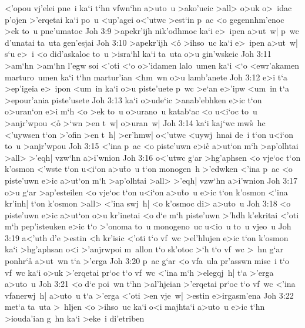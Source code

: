 <'opou
vj'elei
pne~i
ka`i
t`hn
vfwn`hn
a>uto~u
>ako'ueic
>all>
o>uk
o>~idac
p'ojen
>'erqetai
ka`i
po~u
<up'agei
o<'utwc
>est`in
p~ac
<o
gegennhm'enoc
>ek
to~u
pne'umatoc\bibvsend
\vs Joh 3:9
>apekr'ijh
nik'odhmoc
ka`i
e>~ipen
a>ut~w|
p~wc
d'unatai
ta~uta
gen'esjai\bibvsend
\vs Joh 3:10
>apekr'ijh
<o\r{}
>ihso~uc
ka`i
e>~ipen
a>ut~w|
s`u
e>~i
<o
did'askaloc
to~u
>isra`hl
ka`i
ta~uta
o>u
gin'wskeic\bibvsend
\vs Joh 3:11
>am`hn
>am`hn
l'egw
soi
<'oti
<`o
o>'idamen
lalo~umen
ka`i
<`o
<ewr'akamen
marturo~umen
ka`i
t`hn
martur'ian
<hm~wn
o>u
lamb'anete\bibvsend
\vs Joh 3:12
e>i
t`a
>ep'igeia
e>~ipon
<um~in
ka`i
o>u
piste'uete
p~wc
>e`an
e>'ipw
<um~in
t`a
>epour'ania
piste'usete\bibvsend
\vs Joh 3:13
ka`i
o>ude`ic
>anab'ebhken
e>ic
t`on
o>uran`on
e>i
m`h
<o
>ek
to~u
o>urano~u
katab`ac
<o
u<i`oc
to~u
>anjr'wpou
<o\r{}
>`wn
>en
t~w|
o>uran~w|\bibvsend
\vs Joh 3:14
ka`i
kaj`wc
mw\r{s}~hc
<'uywsen
t`on
>'ofin
>en
t~h|
>er'hmw|
o<'utwc
<uywj~hnai
de~i
t`on
u<i`on
to~u
>anjr'wpou\bibvsend
\vs Joh 3:15
<'ina
p~ac
<o
piste'uwn
e>ic\r{}
a>ut`on
m`h
>ap'olhtai
>all>
>'eqh|
vzw`hn
a>i'wnion\bibvsend
\vs Joh 3:16
o<'utwc
g`ar
>hg'aphsen
<o
vje`oc
t`on
k'osmon
<'wste
t`on
u<i`on
a>u\r{t}o~u
t`on
monogen~h
>'edwken
<'ina
p~ac
<o
piste'uwn
e>ic
a>ut`on
m`h
>ap'olhtai
>all>
>'eqh|
vzw`hn
a>i'wnion\bibvsend
\vs Joh 3:17
o>u
g`ar
>ap'esteilen
<o
vje`oc
t`on
u<i`on
a>u\r{t}o~u
e>ic
t`on
k'osmon
<'ina
kr'inh|
t`on
k'osmon
>all>
<'ina
swj~h|
<o
k'osmoc
di>
a>uto~u\bibvsend
\vs Joh 3:18
<o
piste'uwn
e>ic
a>ut`on
o>u
kr'inetai
<o
d`e
m`h
piste'uwn
>'hdh
k'ekritai
<'oti
m`h
pep'isteuken
e>ic
t`o
>'onoma
to~u
monogeno~uc
u<io~u
to~u
vjeo~u\bibvsend
\vs Joh 3:19
a<'uth
d'e
>estin
<h
kr'isic
<'oti
t`o
vf~wc
>el'hlujen
e>ic
t`on
k'osmon
ka`i
>hg'aphsan
o<i
>'anjrwpoi
m~allon
t`o
sk'otoc
>`h
t`o
vf~wc
>~hn
g`ar
ponhr`a\r{}
a>ut~wn
t`a
>'erga\bibvsend
\vs Joh 3:20
p~ac
g`ar
<o
vfa~ula
pr'asswn
mise~i
t`o
vf~wc
ka`i
o>uk
>'erqetai
pr`oc
t`o
vf~wc
<'ina
m`h
>elegqj~h|
t`a
>'erga
a>uto~u\bibvsend
\vs Joh 3:21
<o
d`e
poi~wn
t`hn
>al'hjeian
>'erqetai
pr`oc
t`o
vf~wc
<'ina
vfanerwj~h|
a>uto~u
t`a
>'erga
<'oti
>en
vje~w|
>estin
e>irgasm'ena\bibvsend
\vs Joh 3:22
met`a
ta~uta
>~hljen
<o
>ihso~uc
ka`i
o<i
majhta`i
a>uto~u
e>ic
t`hn
>iouda'ian
g~hn
ka`i
>eke~i
di'etriben
